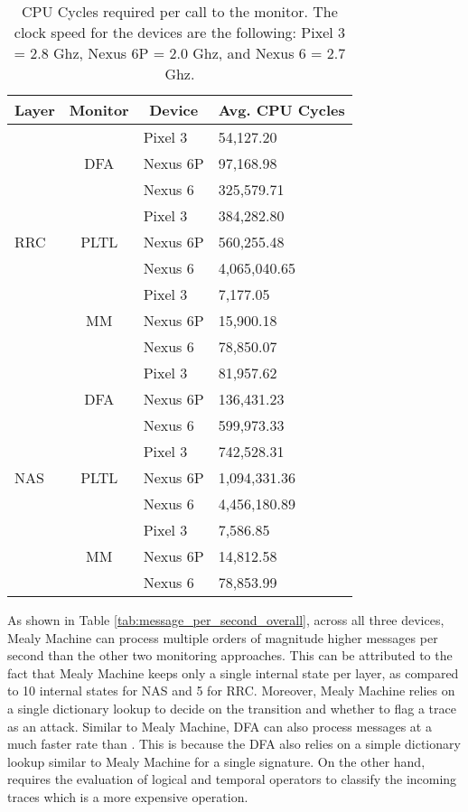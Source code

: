 \begin{table}[]
  \centering
	\begin{tabular}{|l|c|l|l|}
	\hline
	\multicolumn{1}{|c|}{\textbf{Layer}} & \textbf{Monitor} & \multicolumn{1}{c|}{\textbf{Device}} & \multicolumn{1}{c|}{\textbf{Avg. CPU Cycles}} \\ \hline
	\multirow{9}{*}{RRC} & \multirow{3}{*}{DFA} & Pixel 3 & 54,127.20 \\ \cline{3-4}
	 &  & Nexus 6P & 97,168.98 \\ \cline{3-4}
	 &  & Nexus 6 & 325,579.71 \\ \cline{2-4}
	 & \multirow{3}{*}{PLTL} & Pixel 3 & 384,282.80 \\ \cline{3-4}
	 &  & Nexus 6P & 560,255.48 \\ \cline{3-4}
	 &  & Nexus 6 & 4,065,040.65 \\ \cline{2-4}
	 & \multirow{3}{*}{MM} & Pixel 3 & 7,177.05 \\ \cline{3-4}
	 &  & Nexus 6P & 15,900.18 \\ \cline{3-4}
	 &  & Nexus 6 & 78,850.07 \\ \hline
	\multirow{9}{*}{NAS} & \multirow{3}{*}{DFA} & Pixel 3 & 81,957.62 \\ \cline{3-4}
	 &  & Nexus 6P & 136,431.23 \\ \cline{3-4}
	 &  & Nexus 6 & 599,973.33 \\ \cline{2-4}
	 & \multirow{3}{*}{PLTL} & Pixel 3 & 742,528.31 \\ \cline{3-4}
	 &  & Nexus 6P & 1,094,331.36 \\ \cline{3-4}
	 &  & Nexus 6 & 4,456,180.89 \\ \cline{2-4}
	 & \multirow{3}{*}{MM} & Pixel 3 & 7,586.85 \\ \cline{3-4}
	 &  & Nexus 6P & 14,812.58 \\ \cline{3-4}
	 &  & Nexus 6 & 78,853.99 \\ \hline
	\end{tabular}
\caption{CPU Cycles required per call to the monitor. The clock speed for the devices
are the following: Pixel 3 = 2.8 Ghz, Nexus 6P = 2.0 Ghz, and  Nexus 6 = 2.7 Ghz.}
\label{tab:cpu_cycles_tab}
\end{table}

As shown in Table \ref{tab:message_per_second_overall}, across all three
devices, Mealy Machine can process multiple orders of magnitude higher messages
per second than the other two monitoring approaches. This can be attributed to the
fact that Mealy Machine keeps only
a single internal state per layer, as compared to 10 internal states for
NAS and 5 for RRC. Moreover, Mealy Machine relies on a single dictionary
lookup to decide on the transition and whether to flag a trace as an attack.
Similar to Mealy Machine, DFA can also process messages at a much faster
rate than \pltl. This is because the DFA also relies on a simple
dictionary lookup similar to Mealy Machine for a single signature.
On the other hand, \pltl requires the evaluation of logical and
temporal operators to classify the incoming traces which is a
more expensive operation.


